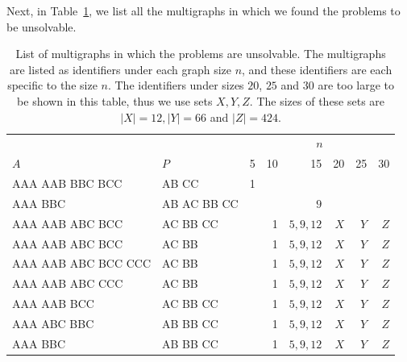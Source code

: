 Next, in Table~\ref{tbl:results:asd3}, we list all the multigraphs in which we found the problems to be unsolvable.

\begin{table}[H]
    \centering
    \begin{tabular}{ll|r|r|r|r|r|r}
        \toprule
        && \multicolumn{6}{c}{$n$} \\
        \cmidrule{3-8}
        $A$ & $P$ & 5&10&15&20&25&30\\
        \midrule
        AAA AAB BBC BCC     & AB CC       & 1 &   &          &     &     &    \\
        AAA BBC             & AB AC BB CC &   &   & $9$      &     &     &    \\
        AAA AAB ABC BCC     & AC BB CC    &   & 1 & $5,9,12$ & $X$ & $Y$ & $Z$\\
        AAA AAB ABC BCC     & AC BB       &   & 1 & $5,9,12$ & $X$ & $Y$ & $Z$\\
        AAA AAB ABC BCC CCC & AC BB       &   & 1 & $5,9,12$ & $X$ & $Y$ & $Z$\\
        AAA AAB ABC CCC     & AC BB       &   & 1 & $5,9,12$ & $X$ & $Y$ & $Z$\\
        AAA AAB BCC         & AC BB CC    &   & 1 & $5,9,12$ & $X$ & $Y$ & $Z$\\
        AAA ABC BBC         & AB BB CC    &   & 1 & $5,9,12$ & $X$ & $Y$ & $Z$\\
        AAA BBC             & AB BB CC    &   & 1 & $5,9,12$ & $X$ & $Y$ & $Z$\\
        \bottomrule
    \end{tabular}
    \caption{%
    List of multigraphs in which the problems are unsolvable.
    The multigraphs are listed as identifiers under each graph size $n$, and these identifiers are each specific to the size $n$.
    The identifiers under sizes $20$, $25$ and $30$ are too large to be shown in this table, thus we use sets $X,Y,Z$.
    The sizes of these sets are $|X|=12, |Y|=66$ and $|Z|=424$.
    }
    \label{tbl:results:asd3}
\end{table}


